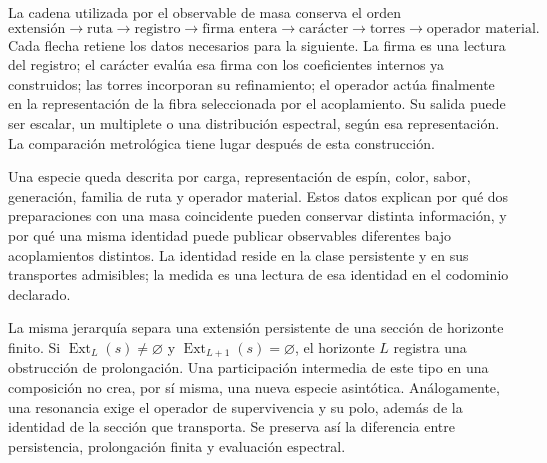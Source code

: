 La cadena utilizada por el observable de masa conserva el orden
\begin{equation}
 \text{extensión}\longrightarrow\text{ruta}\longrightarrow
 \text{registro}\longrightarrow\text{firma entera}\longrightarrow
 \text{carácter}\longrightarrow\text{torres}\longrightarrow
 \text{operador material}.
 \label{vi:eq:cadena-material}
\end{equation}
Cada flecha retiene los datos necesarios para la siguiente. La firma es
una lectura del registro; el carácter evalúa esa firma con los
coeficientes internos ya construidos; las torres incorporan su
refinamiento; el operador actúa finalmente en la representación de la
fibra seleccionada por el acoplamiento. Su salida puede ser escalar,
un multiplete o una distribución espectral, según esa representación.
La comparación metrológica tiene lugar después de esta construcción.

Una especie queda descrita por carga, representación de espín, color,
sabor, generación, familia de ruta y operador material. Estos datos
explican por qué dos preparaciones con una masa coincidente pueden
conservar distinta información, y por qué una misma identidad puede
publicar observables diferentes bajo acoplamientos distintos. La
identidad reside en la clase persistente y en sus transportes admisibles;
la medida es una lectura de esa identidad en el codominio declarado.

La misma jerarquía separa una extensión persistente de una sección de
horizonte finito. Si $\operatorname{Ext}_L(s)\ne\varnothing$ y
$\operatorname{Ext}_{L+1}(s)=\varnothing$, el horizonte $L$ registra
una obstrucción de prolongación. Una participación intermedia de este
tipo en una composición no crea, por sí misma, una nueva especie
asintótica. Análogamente, una resonancia exige el operador de
supervivencia y su polo, además de la identidad de la sección que
transporta. Se preserva así la diferencia entre persistencia,
prolongación finita y evaluación espectral.
